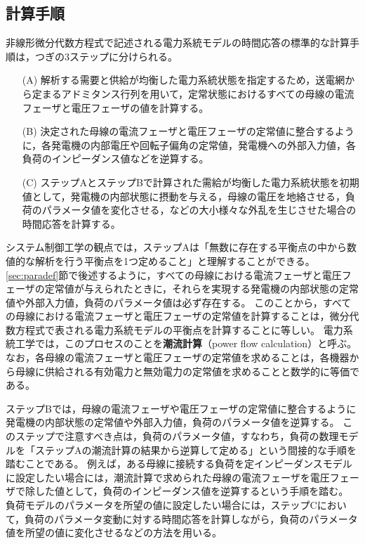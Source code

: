 \documentclass[tombow,dvipdfmx]{corona-a5-1.1}
\begin{document}
\subsection{計算手順}\label{sec:numstep}

非線形微分代数方程式で記述される電力系統モデルの時間応答の標準的な計算手順は，つぎの3ステップに分けられる。

\begin{itemize}
\item[(A)] 解析する需要と供給が均衡した電力系統状態を指定するため，送電網から定まるアドミタンス行列を用いて，定常状態におけるすべての母線の電流フェーザと電圧フェーザの値を計算する。
\item[(B)] 決定された母線の電流フェーザと電圧フェーザの定常値に整合するように，各発電機の内部電圧や回転子偏角の定常値，発電機への外部入力値，各負荷のインピーダンス値などを逆算する。
\item[(C)] ステップAとステップBで計算された需給が均衡した電力系統状態を初期値として，発電機の内部状態に摂動を与える，母線の電圧を地絡させる，負荷のパラメータ値を変化させる，などの大小様々な外乱を生じさせた場合の時間応答を計算する。
\end{itemize}

システム制御工学の観点では，ステップAは「無数に存在する平衡点の中から数値的な解析を行う平衡点を1つ定めること」と理解することができる。
\ref{sec:paradef}節で後述するように，すべての母線における電流フェーザと電圧フェーザの定常値が与えられたときに，それらを実現する発電機の内部状態の定常値や外部入力値，負荷のパラメータ値は必ず存在する。
このことから，すべての母線における電流フェーザと電圧フェーザの定常値を計算することは，微分代数方程式で表される電力系統モデルの平衡点を計算することに等しい。
電力系統工学では，このプロセスのことを\textbf{潮流計算}（power flow calculation）と呼ぶ。
なお，各母線の電流フェーザと電圧フェーザの定常値を求めることは，各機器から母線に供給される有効電力と無効電力の定常値を求めることと数学的に等価である。

ステップBでは，母線の電流フェーザや電圧フェーザの定常値に整合するように発電機の内部状態の定常値や外部入力値，負荷のパラメータ値を逆算する。
このステップで注意すべき点は，負荷のパラメータ値，すなわち，負荷の数理モデルを「ステップAの潮流計算の結果から逆算して定める」という間接的な手順を踏むことである。
例えば，ある母線に接続する負荷を定インピーダンスモデルに設定したい場合には，潮流計算で求められた母線の電流フェーザを電圧フェーザで除した値として，負荷のインピーダンス値を逆算するという手順を踏む。
負荷モデルのパラメータを所望の値に設定したい場合には，ステップCにおいて，負荷のパラメータ変動に対する時間応答を計算しながら，負荷のパラメータ値を所望の値に変化させるなどの方法を用いる。
\end{document}
